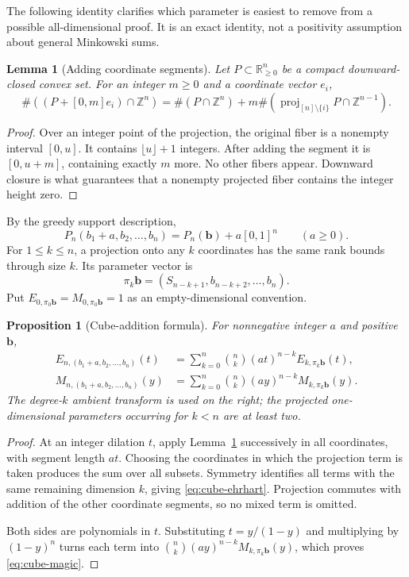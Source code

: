 \documentclass[11pt]{article}
\newtheorem{proposition}[theorem]{Proposition}
\newtheorem{lemma}[theorem]{Lemma}
\theoremstyle{definition}
\newcommand{\Z}{\mathbb Z}
\newcommand{\R}{\mathbb R}
\newcommand{\bb}{\mathbf b}
\DeclareMathOperator{\proj}{proj}
\numberwithin{equation}{section}
\begin{document}
The following identity clarifies which parameter is easiest to remove from
a possible all-dimensional proof. It is an exact identity, not a positivity
assumption about general Minkowski sums.

\begin{lemma}[Adding coordinate segments]
\label{lem:segments}
Let $P\subset\R_{\ge0}^n$ be a compact downward-closed convex set. For an
integer $m\ge0$ and a coordinate vector $e_i$,
\[
 \#((P+[0,m]e_i)\cap\Z^n)
 =\#(P\cap\Z^n)+m\#(\proj_{[n]\setminus\{i\}}P\cap\Z^{n-1}).
\]
\end{lemma}
\begin{proof}
Over an integer point of the projection, the original fiber is a nonempty
interval $[0,u]$. It contains $\lfloor u\rfloor+1$ integers. After adding
the segment it is $[0,u+m]$, containing exactly $m$ more. No other fibers
appear. Downward closure is what guarantees that a nonempty projected
fiber contains the integer height zero.
\end{proof}

By the greedy support description,
\begin{equation}
 P_n(b_1+a,b_2,\ldots,b_n)=P_n(\bb)+a[0,1]^n
 \qquad(a\ge0).
 \label{eq:cube-sum}
\end{equation}
For $1\le k\le n$, a projection onto any $k$ coordinates has the same
rank bounds through size $k$. Its parameter vector is
\[
 \pi_k\bb=(S_{n-k+1},b_{n-k+2},\ldots,b_n).
\]
Put $E_{0,\pi_0\bb}=M_{0,\pi_0\bb}=1$ as an empty-dimensional convention.

\begin{proposition}[Cube-addition formula]
\label{prop:cube}
For nonnegative integer $a$ and positive $\bb$,
\begin{align}
 E_{n,(b_1+a,b_2,\ldots,b_n)}(t)
 &=\sum_{k=0}^n\binom nk (at)^{n-k}E_{k,\pi_k\bb}(t),
 \label{eq:cube-ehrhart}\\
 M_{n,(b_1+a,b_2,\ldots,b_n)}(y)
 &=\sum_{k=0}^n\binom nk (ay)^{n-k}M_{k,\pi_k\bb}(y).
 \label{eq:cube-magic}
\end{align}
The degree-$k$ ambient transform is used on the right; the projected
one-dimensional parameters occurring for $k<n$ are at least two.
\end{proposition}
\begin{proof}
At an integer dilation $t$, apply Lemma~\ref{lem:segments} successively
in all coordinates, with segment length $at$. Choosing the coordinates
in which the projection term is taken produces the sum over all subsets.
Symmetry identifies all terms with the same remaining dimension $k$,
giving \eqref{eq:cube-ehrhart}. Projection commutes with addition of the
other coordinate segments, so no mixed term is omitted.

Both sides are polynomials in $t$. Substituting $t=y/(1-y)$ and multiplying
by $(1-y)^n$ turns each term into
$\binom nk(ay)^{n-k}M_{k,\pi_k\bb}(y)$, which proves
\eqref{eq:cube-magic}.
\end{proof}
\end{document}
